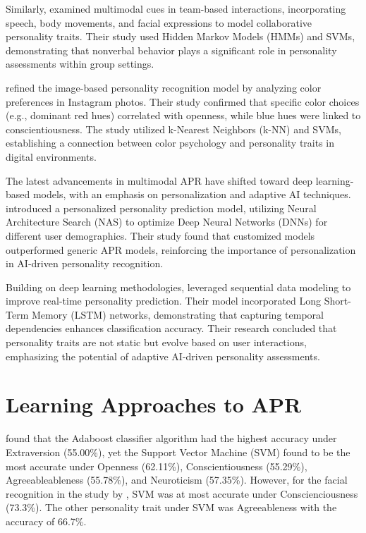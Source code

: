 Similarly, \citet{Batrinca2016} examined multimodal cues in team-based interactions, incorporating speech, body movements, and facial expressions to model collaborative personality traits. Their study used Hidden Markov Models (HMMs) and SVMs, demonstrating that nonverbal behavior plays a significant role in personality assessments within group settings.

\citet{Branz2020} refined the image-based personality recognition model by analyzing color preferences in Instagram photos. Their study confirmed that specific color choices (e.g., dominant red hues) correlated with openness, while blue hues were linked to conscientiousness. The study utilized k-Nearest Neighbors (k-NN) and SVMs, establishing a connection between color psychology and personality traits in digital environments.

The latest advancements in multimodal APR have shifted toward deep learning-based models, with an emphasis on personalization and adaptive AI techniques. \citet{Salam2022} introduced a personalized personality prediction model, utilizing Neural Architecture Search (NAS) to optimize Deep Neural Networks (DNNs) for different user demographics. Their study found that customized models outperformed generic APR models, reinforcing the importance of personalization in AI-driven personality recognition.

Building on deep learning methodologies, \citet{Lima2022} leveraged sequential data modeling to improve real-time personality prediction. Their model incorporated Long Short-Term Memory (LSTM) networks, demonstrating that capturing temporal dependencies enhances classification accuracy. Their research concluded that personality traits are not static but evolve based on user interactions, emphasizing the potential of adaptive AI-driven personality assessments.

\section{Learning Approaches to APR}
\label{sec: LearningApproaches}

\citet{mairesse_using_2007} found that the Adaboost classifier algorithm had the highest accuracy under Extraversion (55.00\%), yet the Support Vector Machine (SVM) found to be the most accurate under Openness (62.11\%), Conscientiousness (55.29\%), Agreeableableness (55.78\%), and Neuroticism (57.35\%). However, for the facial recognition in the study by \citet{celli_automatic_2014}, SVM was at most accurate under Conscienciousness (73.3\%). The other personality trait under SVM was Agreeableness with the accuracy of 66.7\%.

